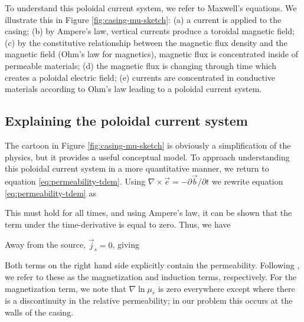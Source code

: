 \documentclass[onecolumn, extra, mreferee]{gji}
\begin{document}


To understand this poloidal current system, we refer to Maxwell's equations. We illustrate this in Figure \ref{fig:casing-mu-sketch}: (a) a current is applied to the casing; (b) by Ampere's law, vertical currents produce a toroidal magnetic field; (c) by the constitutive relationship between the magnetic flux density and the magnetic field (Ohm's law for magnetics), magnetic flux is concentrated inside of permeable materials; (d) the magnetic flux is changing through time which creates a poloidal electric field; (e) currents are concentrated in conductive materials according to Ohm's law leading to a poloidal current system.





\subsection{Explaining the poloidal current system}
The cartoon in Figure \ref{fig:casing-mu-sketch} is obviously a simplification of the physics, but it provides a useful conceptual model. To approach understanding this poloidal current system in a more quantitative manner, we return to equation \ref{eq:permeability-tdem}. Using $\nabla \times \vec{e} = -\partial\vec{b}/\partial t$ we rewrite equation \ref{eq:permeability-tdem} as

This must hold for all times, and using Ampere's law, it can be shown that the term under the time-derivative is equal to zero. Thus, we have

Away from the source, $\vec{j}_s=0$, giving


Both terms on the right hand side explicitly contain the permeability. Following \cite{Pavlov2001, Noh2016}, we refer to these as the magnetization and induction terms, respectively. For the magnetization term, we note that $\nabla \ln \mu_r$ is zero everywhere except where there is a discontinuity in the relative permeability; in our problem this occurs at the walls of the casing.
\end{document}
